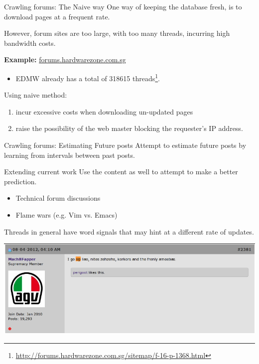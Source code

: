 \documentclass[compress]{beamer}
\begin{document}
\begin{frame}{Crawling forums: The Naive way}
	One way of keeping the database fresh, is to download pages at a frequent rate.

	However, forum sites are too large, with too many threads, incurring high bandwidth costs.

\textbf{Example:} \url{forums.hardwarezone.com.sg}
\begin{itemize}
	\item EDMW already has a total of 318615 threads\footnote{\url{http://forums.hardwarezone.com.sg/sitemap/f-16-p-1368.html}}.
\end{itemize}
\end{frame}
\begin{frame}
Using naive method:
	\begin{enumerate}
		\item incur excessive costs when downloading un-updated pages
		\item raise the possibility of the web master blocking the requester's IP address.
	\end{enumerate}

\end{frame}
\begin{frame}{Crawling forums: Estimating Future posts}
	Attempt to estimate future posts by learning from intervals between past posts.
\end{frame}
\begin{frame}{Extending current work}
	Use the content as well to attempt to make a better prediction.
	\begin{itemize}
		\item Technical forum discussions
		\item Flame wars (e.g. Vim vs. Emacs)
	\end{itemize}
	Threads in general have word signals that may hint at a different rate of updates.
	\begin{center}
		\includegraphics[scale=0.35]{nitez.png}
	\end{center}
\end{frame}
\end{document}
